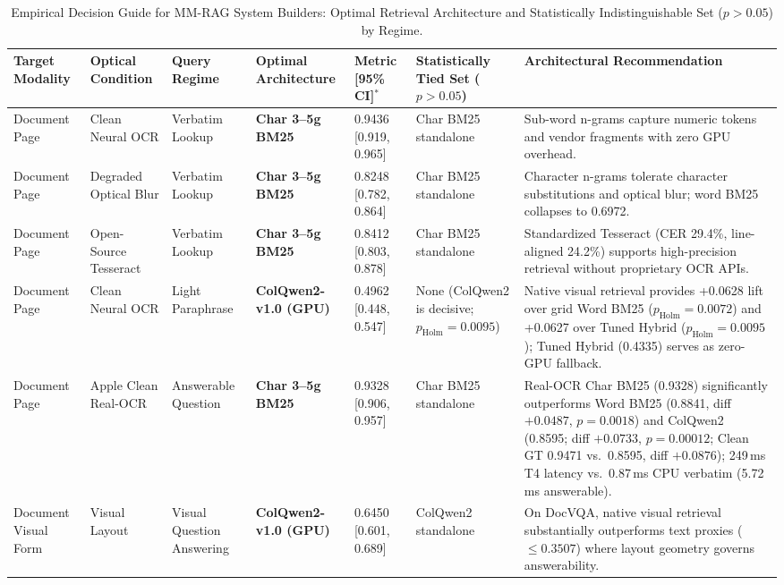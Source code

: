 \begin{table}[t]
\centering\footnotesize
\setlength{\tabcolsep}{2.5pt}
\caption{Empirical Decision Guide for MM-RAG System Builders: Optimal Retrieval Architecture and Statistically Indistinguishable Set ($p > 0.05$) by Regime.}\label{tab:decision_guide_v6}
\begin{tabular}{@{}p{1.6cm}p{1.8cm}p{1.8cm}p{2.1cm}p{1.8cm}p{2.3cm}p{4.1cm}@{}}
\toprule
\textbf{Target Modality} & \textbf{Optical Condition} & \textbf{Query Regime} & \textbf{Optimal Architecture} & \textbf{Metric [95\% CI]}$^*$ & \makecell[c]{\textbf{Statistically}\\\textbf{Tied Set}\\\scriptsize($p > 0.05$)} & \textbf{Architectural Recommendation} \\
\midrule
Document Page & Clean Neural OCR & Verbatim Lookup & \textbf{Char 3--5g BM25} & 0.9436 [0.919, 0.965] & Char BM25 standalone & Sub-word n-grams capture numeric tokens and vendor fragments with zero GPU overhead. \\
Document Page & Degraded Optical Blur & Verbatim Lookup & \textbf{Char 3--5g BM25} & 0.8248 [0.782, 0.864] & Char BM25 standalone & Character n-grams tolerate character substitutions and optical blur; word BM25 collapses to 0.6972. \\
Document Page & Open-Source Tesseract & Verbatim Lookup & \textbf{Char 3--5g BM25} & 0.8412 [0.803, 0.878] & Char BM25 standalone & Standardized Tesseract (CER 29.4\%, line-aligned 24.2\%) supports high-precision retrieval without proprietary OCR APIs. \\
Document Page & Clean Neural OCR & Light Paraphrase & \textbf{ColQwen2-v1.0 (GPU)} & 0.4962 [0.448, 0.547] & None (ColQwen2 is decisive; $p_{\text{Holm}} = 0.0095$) & Native visual retrieval provides +0.0628 lift over grid Word BM25 ($p_{\text{Holm}} = 0.0072$) and +0.0627 over Tuned Hybrid ($p_{\text{Holm}} = 0.0095$); Tuned Hybrid (0.4335) serves as zero-GPU fallback. \\
Document Page & Apple Clean Real-OCR & Answerable Question & \textbf{Char 3--5g BM25} & 0.9328 [0.906, 0.957] & Char BM25 standalone & Real-OCR Char BM25 (0.9328) significantly outperforms Word BM25 (0.8841, diff $+0.0487$, $p=0.0018$) and ColQwen2 (0.8595; diff $+0.0733$, $p = 0.00012$; Clean GT 0.9471 vs.\ 0.8595, diff $+0.0876$); 249\,ms T4 latency vs.\ 0.87\,ms CPU verbatim (5.72\,ms answerable). \\
Document Visual Form & Visual Layout & Visual Question Answering & \textbf{ColQwen2-v1.0 (GPU)} & 0.6450 [0.601, 0.689] & ColQwen2 standalone & On DocVQA, native visual retrieval substantially outperforms text proxies ($\le 0.3507$) where layout geometry governs answerability. \\

\end{tabular}
\end{table}
